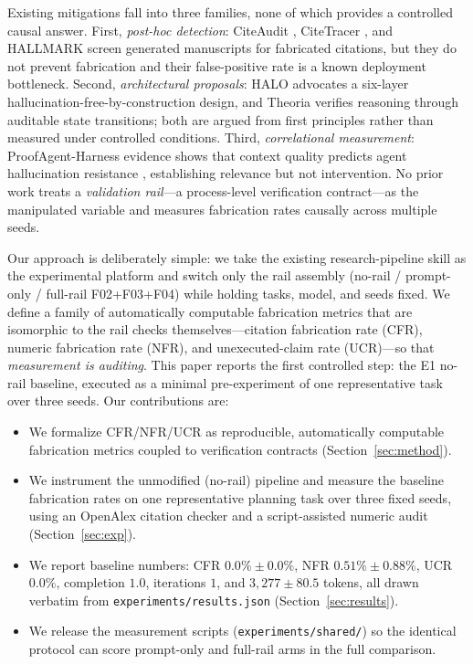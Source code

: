 \documentclass[10pt,twocolumn]{article}
\begin{document}
Existing mitigations fall into three families, none of which provides a controlled causal answer. First, \emph{post-hoc detection}: CiteAudit \citep{shi2026citeaudit}, CiteTracer \citep{li2026citetracer}, and HALLMARK \citep{reizinger2026hallmark} screen generated manuscripts for fabricated citations, but they do not prevent fabrication and their false-positive rate is a known deployment bottleneck. Second, \emph{architectural proposals}: HALO \citep{raduta2026halo} advocates a six-layer hallucination-free-by-construction design, and Theoria \citep{saldivar2026theoria} verifies reasoning through auditable state transitions; both are argued from first principles rather than measured under controlled conditions. Third, \emph{correlational measurement}: ProofAgent-Harness evidence shows that context quality predicts agent hallucination resistance \citep{bousetouane2026context}, establishing relevance but not intervention. No prior work treats a \emph{validation rail}---a process-level verification contract---as the manipulated variable and measures fabrication rates causally across multiple seeds.

Our approach is deliberately simple: we take the existing research-pipeline skill as the experimental platform and switch only the rail assembly (no-rail / prompt-only / full-rail F02+F03+F04) while holding tasks, model, and seeds fixed. We define a family of automatically computable fabrication metrics that are isomorphic to the rail checks themselves---citation fabrication rate (CFR), numeric fabrication rate (NFR), and unexecuted-claim rate (UCR)---so that \emph{measurement is auditing}. This paper reports the first controlled step: the E1 no-rail baseline, executed as a minimal pre-experiment of one representative task over three seeds. Our contributions are:

\begin{itemize}
\item We formalize CFR/NFR/UCR as reproducible, automatically computable fabrication metrics coupled to verification contracts (Section~\ref{sec:method}).
\item We instrument the unmodified (no-rail) pipeline and measure the baseline fabrication rates on one representative planning task over three fixed seeds, using an OpenAlex citation checker and a script-assisted numeric audit (Section~\ref{sec:exp}).
\item We report baseline numbers: CFR $0.0\%\pm 0.0\%$, NFR $0.51\%\pm 0.88\%$, UCR $0.0\%$, completion $1.0$, iterations $1$, and $3{,}277\pm 80.5$ tokens, all drawn verbatim from \texttt{experiments/results.json} (Section~\ref{sec:results}).
\item We release the measurement scripts (\texttt{experiments/shared/}) so the identical protocol can score prompt-only and full-rail arms in the full comparison.
\end{itemize}
\end{document}
